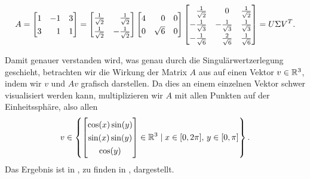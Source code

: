\begin{example}
    \begin{equation*}
        A =
        \begin{bmatrix}
            1 & -1 & 3 \\
            3 & \phantom{-}1 & 1
        \end{bmatrix}
        =
        \begingroup
        \renewcommand{\arraystretch}{1.3}
        \begin{bmatrix}
            \frac{1}{\sqrt{2}} & \phantom{-}\frac{1}{\sqrt{2}} \\
            \frac{1}{\sqrt{2}} & -\frac{1}{\sqrt{2}}
        \end{bmatrix}
        \endgroup
        \begin{bmatrix}
            4 & \phantom{\surd}0 & 0 \\
            0 & \sqrt{6} & 0
        \end{bmatrix}
        \begingroup
        \renewcommand{\arraystretch}{1.3}
        \begin{bmatrix}
            \phantom{-}\frac{1}{\sqrt{2}} & \phantom{-}0 & \frac{1}{\sqrt{2}} \\
            -\frac{1}{\sqrt{3}} & -\frac{1}{\sqrt{3}} & \frac{1}{\sqrt{3}} \\
            -\frac{1}{\sqrt{6}} & \phantom{-}\frac{2}{\sqrt{6}} & \frac{1}{\sqrt{6}} \\
        \end{bmatrix}
        \endgroup
        =
        U \Sigma V^{T}.
    \end{equation*}
\end{example}
Damit genauer verstanden wird, was genau durch die Singulärwertzerlegung geschieht, betrachten wir die Wirkung der Matrix \(A\) aus  auf einen Vektor \(v \in \mathbb{R}^{3}\), indem wir \(v\) und \(Av\) grafisch darstellen.  
Da dies an einem einzelnen Vektor schwer visualisiert werden kann, multiplizieren wir \(A\) mit allen Punkten auf der Einheitssphäre, also allen 
\begin{equation*}
    v \in 
    \left\{
    \begin{bmatrix}
        \cos(x)\sin(y) \\ \sin(x)\sin(y) \\ \cos(y)
    \end{bmatrix}
    \in \R^{3}
    \mid
    x \in [0, 2\pi], \, y \in [0, \pi]
    \right\}.
\end{equation*} 
Das Ergebnis ist in , zu finden in , dargestellt. 

